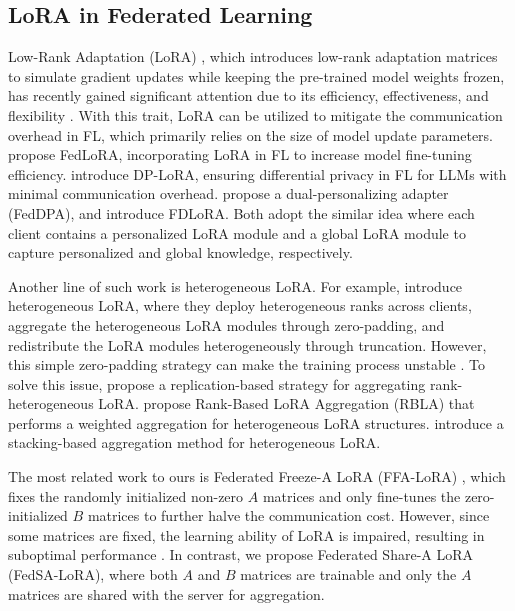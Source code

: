 \documentclass{article} %
\begin{document}
\subsection{LoRA in Federated Learning}

Low-Rank Adaptation (LoRA) \citep{hulora}, which introduces low-rank adaptation matrices to simulate gradient updates while keeping the pre-trained model weights frozen, has recently gained significant attention due to its efficiency, effectiveness, and flexibility \citep{hayou2024lora+,liu2024dora,kopiczko2024vera,wang2024task}. With this trait, LoRA can be utilized to mitigate the communication overhead in FL, which primarily relies on the size of model update parameters. \citet{yi2023fedlora} propose FedLoRA, incorporating LoRA in FL to increase model fine-tuning efficiency. \citet{liu2023differentially} introduce DP-LoRA, ensuring differential privacy in FL for LLMs with minimal communication overhead. \citet{yang2024dual} propose a dual-personalizing adapter (FedDPA), and \citet{qi2024fdlora} introduce FDLoRA. Both adopt the similar idea where each client contains a personalized LoRA module and a global LoRA module to capture personalized and global knowledge, respectively.

Another line of such work is heterogeneous LoRA. For example, \citet{cho2023heterogeneous} introduce heterogeneous LoRA, where they deploy heterogeneous ranks across clients, aggregate the heterogeneous LoRA modules through zero-padding, and redistribute the LoRA modules heterogeneously through truncation. However, this simple zero-padding strategy can make the training process unstable \citep{byun2024towards}. To solve this issue, \citet{byun2024towards} propose a replication-based strategy for aggregating rank-heterogeneous LoRA. \citet{chen2024rbla} propose Rank-Based LoRA Aggregation (RBLA) that performs a weighted aggregation for heterogeneous LoRA structures. \cite{wang2024flora} introduce a stacking-based aggregation method for heterogeneous LoRA.

The most related work to ours is Federated Freeze-A LoRA (FFA-LoRA) \citep{sunimproving}, which fixes the randomly initialized non-zero $A$ matrices and only fine-tunes the zero-initialized $B$ matrices to further halve the communication cost. However, since some matrices are fixed, the learning ability of LoRA is impaired, resulting in suboptimal performance \citep{zhang2023lora}. In contrast, we propose Federated Share-A LoRA (FedSA-LoRA), where both $A$ and $B$ matrices are trainable and only the $A$ matrices are shared with the server for aggregation.
\end{document}
